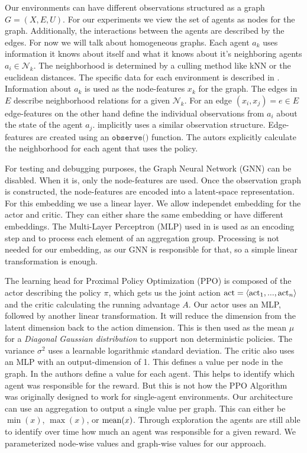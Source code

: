 Our environments can have different observations structured as a graph $G = (X,E,U)$. For our experiments we view the set of agents as nodes for the graph. Additionally, the interactions between the agents are described by the edges. For now we will talk about homogeneous graphs. Each agent $a_k$ uses information it knows about itself and what it knows about it's neighboring agents $a_i \in \mathcal{N}_k$. The neighborhood is determined by a culling method like kNN or the euclidean distances. The specific data for each environment is described in . Information about $a_k$ is used as the node-features $x_k$ for the graph. The edges in $E$ describe neighborhood relations for a given $\mathcal{N}_k$. For an edge $(x_i,x_j) = e \in E$ edge-features on the other hand define the individual observations from $a_i$ about the state of the agent $a_j$.  implicitly uses a similar observation structure. Edge-features are created using an $\texttt{observe()}$ function. The autors explicitly calculate the neighborhood for each agent that uses the policy. \par

For testing and debugging purposes, the Graph Neural Network (GNN) can be disabled. When it is, only the node-features are used. Once the observation graph is constructed, the node-features are encoded into a latent-space representation. For this embedding we use a linear layer. We allow independet embedding for the actor and critic. They can either share the same embedding or have different embeddings. The Multi-Layer Perceptron (MLP) used in  is used as an encoding step and to process each element of an aggregation group. Processing is not needed for our embedding, as our GNN is responsible for that, so a simple linear transformation is enough.\par

The learning head for Proximal Policy Optimization (PPO) is composed of the actor describing the policy $\pi$, which gets us the joint action $\textup{act} = \langle \textup{act}_1,...,\textup{act}_n \rangle$ and the critic calculating the running advantage $A$. Our actor uses an MLP, followed by another linear transformation. It will reduce the dimension from the latent dimension back to the action dimension. This is then used as the mean $\mu$ for a \emph{Diagonal Gaussian distribution} to support non deterministic policies. The variance $\sigma^2$ uses a learnable logarithmic standard deviation. The critic also uses an MLP with an output-dimension of 1. This defines a value per node in the graph. In  the authors define a value for each agent. This helps to identify which agent was responsible for the reward. But this is not how the PPO Algorithm was originally designed to work for single-agent environments. Our architecture can use an aggregation to output a single value per graph. This can either be $\min(x)$, $\max(x)$, or $\textup{mean}(x)$. Through exploration the agents are still able to identify over time how much an agent was responsible for a given reward. We parameterized node-wise values and graph-wise values for our approach. \par



